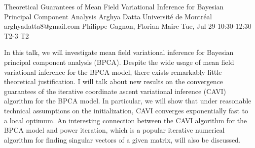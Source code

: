 \begin{talk}
  {Theoretical Guarantees of Mean Field Variational Inference for Bayesian Principal Component Analysis}%
  {Arghya Datta}%
  {Université de Montréal}%
  {arghyadatta8@gmail.com}%
  {Philippe Gagnon, Florian Maire}%
  {}%
  {Tue, Jul 29 10:30-12:30}%
  {T2-3}%
  {T2}%
  
				
			
In this talk, we will investigate mean field variational inference for Bayesian principal component analysis (BPCA). Despite the wide usage of mean field variational inference for the BPCA model, there exists remarkably little theoretical justification. I will talk about new results on the convergence guarantees of the iterative coordinate ascent variational inference (CAVI) algorithm for the BPCA model. In particular, we will show that under reasonable technical assumptions on the initialization, CAVI converges exponentially fast to a local optimum. An interesting connection between the CAVI algorithm for the BPCA model and power iteration, which is a popular iterative numerical algorithm for finding singular vectors of a given matrix, will also be discussed.


\end{talk}

